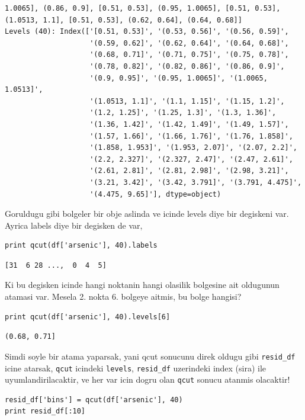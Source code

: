 \documentclass[12pt,fleqn]{article}\usepackage{../common}
\begin{document}
\begin{verbatim}
1.0065], (0.86, 0.9], [0.51, 0.53], (0.95, 1.0065], [0.51, 0.53], (1.0513, 1.1], [0.51, 0.53], (0.62, 0.64], (0.64, 0.68]]
Levels (40): Index(['[0.51, 0.53]', '(0.53, 0.56]', '(0.56, 0.59]',
                    '(0.59, 0.62]', '(0.62, 0.64]', '(0.64, 0.68]',
                    '(0.68, 0.71]', '(0.71, 0.75]', '(0.75, 0.78]',
                    '(0.78, 0.82]', '(0.82, 0.86]', '(0.86, 0.9]',
                    '(0.9, 0.95]', '(0.95, 1.0065]', '(1.0065, 1.0513]',
                    '(1.0513, 1.1]', '(1.1, 1.15]', '(1.15, 1.2]',
                    '(1.2, 1.25]', '(1.25, 1.3]', '(1.3, 1.36]',
                    '(1.36, 1.42]', '(1.42, 1.49]', '(1.49, 1.57]',
                    '(1.57, 1.66]', '(1.66, 1.76]', '(1.76, 1.858]',
                    '(1.858, 1.953]', '(1.953, 2.07]', '(2.07, 2.2]',
                    '(2.2, 2.327]', '(2.327, 2.47]', '(2.47, 2.61]',
                    '(2.61, 2.81]', '(2.81, 2.98]', '(2.98, 3.21]',
                    '(3.21, 3.42]', '(3.42, 3.791]', '(3.791, 4.475]',
                    '(4.475, 9.65]'], dtype=object)
\end{verbatim}

Goruldugu gibi bolgeler bir obje aslinda ve icinde levels diye bir
degiskeni var. Ayrica labels diye bir degisken de var,


\begin{verbatim}
print qcut(df['arsenic'], 40).labels
\end{verbatim}

\begin{verbatim}
[31  6 28 ...,  0  4  5]
\end{verbatim}

Ki bu degisken icinde hangi noktanin hangi olasilik bolgesine ait oldugunun
atamasi var. Mesela 2. nokta 6. bolgeye aitmis, bu bolge hangisi?

\begin{verbatim}
print qcut(df['arsenic'], 40).levels[6]
\end{verbatim}

\begin{verbatim}
(0.68, 0.71]
\end{verbatim}

Simdi soyle bir atama yaparsak, yani qcut sonucunu direk oldugu gibi
\verb!resid_df! icine atarsak, \verb!qcut! icindeki \verb!levels!,
\verb!resid_df!  uzerindeki index (sira) ile uyumlandirilacaktir, ve her
var icin dogru olan \verb!qcut! sonucu atanmis olacaktir!

\begin{verbatim}
resid_df['bins'] = qcut(df['arsenic'], 40)
print resid_df[:10]
\end{verbatim}
\end{document}
